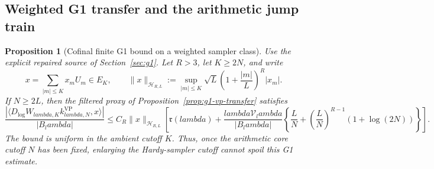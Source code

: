 \documentclass[11pt]{article}
\def\lambda{lambda}%
\newtheorem{proposition}[theorem]{Proposition}
\theoremstyle{remark}
\begin{document}
\subsection{Weighted G1 transfer and the arithmetic jump train}\label{sec:weighted}
\begin{proposition}[Cofinal finite G1 bound on a weighted sampler class]\label{prop:g1-weighted-sampler}
Use the explicit repaired source of Section~\ref{sec:g1}.
Let $R>3$, let $K\ge2N$, and write
\[
 x=\sum_{|m|\le K}x_mU_m\in E_K,
 \qquad
 \|x\|_{\mathcal H_{R,L}}
 :=\sup_{|m|\le K}
 \sqrt L\left(1+\frac{|m|}{L}\right)^R|x_m|.
\]
If $N\ge2L$, then the filtered proxy of
Proposition~\ref{prop:g1-vp-transfer} satisfies
\begin{equation}\label{eq:g1-weighted-sampler}
 \boxed{
 \frac{|\langle D_{\log}W_{\lambda,K}
 k^{\mathrm{VP}}_{\lambda,N},x\rangle|}{|B_\lambda|}
 \le C_R\|x\|_{\mathcal H_{R,L}}
 \left[
 \mathfrak r(\lambda)
 +\frac{\lambda\mathcal V_\lambda}{|B_\lambda|}
 \left\{
 \frac{L}{N}
 +\left(\frac{L}{N}\right)^{R-1}(1+\log(2N))
 \right\}
 \right].}
\end{equation}
The bound is uniform in the ambient cutoff $K$.  Thus, once the arithmetic
core cutoff $N$ has been fixed, enlarging the Hardy-sampler cutoff cannot
spoil this G1 estimate.
\end{proposition}
\end{document}
